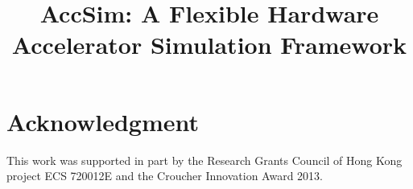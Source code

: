\documentclass[conference]{IEEEtran}
\begin{document}
\title{AccSim: A Flexible Hardware Accelerator Simulation Framework}

\author{
}
\maketitle

\begin{abstract}

\end{abstract}
 







\section*{Acknowledgment}
This work was supported in part by the Research Grants Council of Hong Kong project ECS 720012E and
the Croucher Innovation Award 2013. 





\end{document}
